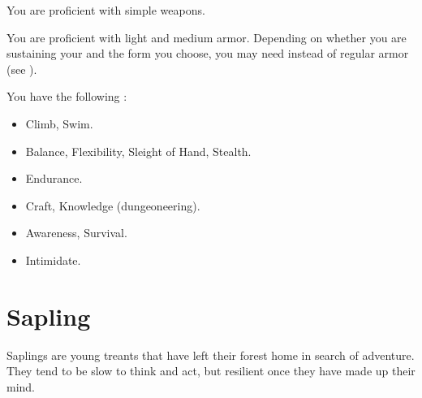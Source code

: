 You are proficient with simple weapons.

You are proficient with light and medium armor.
Depending on whether you are sustaining your  and the form you choose, you may need  instead of regular armor (see ).

You have the following :
\begin{itemize}
	\item {} Climb, Swim.
	\item {} Balance, Flexibility, Sleight of Hand, Stealth.
	\item {} Endurance.
	\item {} Craft, Knowledge (dungeoneering).
	\item {} Awareness, Survival.
	\item {} Intimidate.
\end{itemize}

\section{Sapling}

Saplings are young treants that have left their forest home in search of adventure.
They tend to be slow to think and act, but resilient once they have made up their mind.

